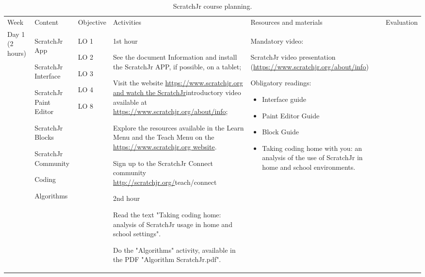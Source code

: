 \documentclass[english]{textolivre}
\begin{document}
{
\scriptsize
\setlength{\tabcolsep}{3pt} 
\begin{longtable}{>{\raggedright\arraybackslash}p{1.1cm} >{\raggedright\arraybackslash}p{2cm} >{\raggedright\arraybackslash}p{0.75cm} >{\raggedright\arraybackslash}p{3.3cm} >{\raggedright\arraybackslash}p{3.3cm} >{\raggedright\arraybackslash}p{3cm}}
\caption{ScratchJr course planning.}
\label{tbl1}
\\
\toprule
\multicolumn{6}{c}{COURSE ScratchJr} \\
\midrule
Week & Content & Objec\-tive & Activities & Resources and materials &
Evaluation  \\
\midrule
Day 1 \newline 
(2 hours) &

ScratchJr App

ScratchJr Interface

ScratchJr Paint Editor

ScratchJr Blocks

ScratchJr Community

Coding

Algorithms &

LO 1

LO 2

LO 3

LO 4

LO 8 &

1st hour

See the document Information and install the ScratchJr APP, if possible, on a tablet;

Visit the website \url{https://www.scratchjr.org and watch the ScratchJr}introductory video available at \url{https://www.scratchjr.org/about/info};  

Explore the resources available in the Learn Menu and the Teach Menu on the \url{https://www.scratchjr.org website}.

Sign up to the ScratchJr Connect community \url{http://scratchjr.org/}teach/connect

2nd hour

Read the text "Taking coding home: analysis of ScratchJr usage in home and school settings".

Do the "Algorithms" activity, available in the PDF "Algorithm ScratchJr.pdf". &

Mandatory video:

ScratchJr video presentation (\url{https://www.scratchjr.org/about/info})

Obligatory readings:
\begin{itemize}
    \item Interface guide
    \item Paint Editor Guide
    \item Block Guide
    \item Taking coding home with you: an analysis of the use of ScratchJr in home and school environments.
\end{itemize}
 

\end{longtable}}
\end{document}
